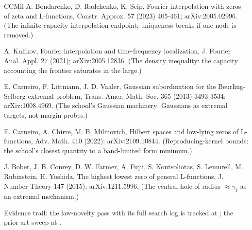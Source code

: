 \documentclass[10pt]{article}
\begin{document}
\begin{thebibliography}{CCMil}
 A. Bondarenko, D. Radchenko, K. Seip, Fourier interpolation with zeros of zeta and L-functions, Constr. Approx. 57 (2023) 405-461; arXiv:2005.02996. (The infinite-capacity interpolation endpoint; uniqueness breaks if one node is removed.)

 A. Kulikov, Fourier interpolation and time-frequency localization, J. Fourier Anal. Appl. 27 (2021); arXiv:2005.12836. (The density inequality: the capacity accounting the frontier saturates in the large.)

 E. Carneiro, F. Littmann, J. D. Vaaler, Gaussian subordination for the Beurling-Selberg extremal problem, Trans. Amer. Math. Soc. 365 (2013) 3493-3534; arXiv:1008.4969. (The school's Gaussian machinery: Gaussians as extremal targets, not margin probes.)

 E. Carneiro, A. Chirre, M. B. Milinovich, Hilbert spaces and low-lying zeros of L-functions, Adv. Math. 410 (2022); arXiv:2109.10844. (Reproducing-kernel bounds: the school's closest quantity to a band-limited form minimum.)

 J. Bober, J. B. Conrey, D. W. Farmer, A. Fujii, S. Koutsoliotas, S. Lemurell, M. Rubinstein, H. Yoshida, The highest lowest zero of general L-functions, J. Number Theory 147 (2015); arXiv:1211.5996. (The central hole of radius $\approx \gamma_1$ as an extremal mechanism.)

\end{thebibliography}

\medskip

\noindent Evidence trail: the law-novelty pass with its full search log is tracked at ; the prior-art sweep at .
\end{document}
